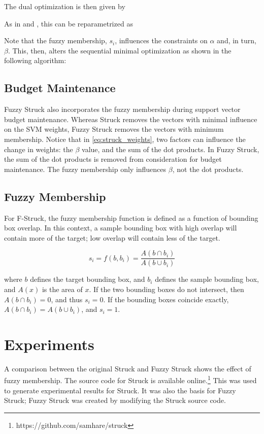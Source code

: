 \documentclass{IEEEtran}
\begin{document}
The dual optimization is then given by
\fuzzyStruckDualAlpha

As in \cite{sequential-minimal-optimization-a-fast-algorithm-for-training-support-vector-machines}
and \cite{6126251}, this can be reparametrized as
\fuzzyStruckDualBeta

Note that the fuzzy membership, \(s_i\), influences the constraints on \(\alpha\) and, in turn,
\(\beta\). This, then, alters the sequential minimal optimization as shown in the following
algorithm:

\fuzzyStruckSmo

\subsection{Budget Maintenance} %
Fuzzy Struck also incorporates the fuzzy membership during support vector budget maintenance.
Whereas Struck removes the vectors with minimal influence on the SVM weights, Fuzzy Struck removes
the vectors with minimum membership. Notice that in \eqref{eq:struck_weights}, two factors can
influence the change in weights: the \(\beta\) value, and the sum of the dot products. In Fuzzy
Struck, the sum of the dot products is removed from consideration for budget maintenance. The fuzzy
membership only influences \(\beta\), not the dot products.

\subsection{Fuzzy Membership} %
For F-Struck, the fuzzy membership function is defined as a function of bounding box overlap. In
this context, a sample bounding box with high overlap will contain more of the target; low overlap
will contain less of the target.

\begin{displaymath}
    s_i = f\left(b, b_i\right) = \frac{A(b \cap b_i)}{A(b \cup b_i)}
\end{displaymath}

where \(b\) defines the target bounding box, and \(b_i\) defines the sample bounding box, and
\(A(x)\) is the area of \(x\). If the two bounding boxes do not intersect, then \(A\left(b \cap
b_i\right) = 0\), and thus \(s_i = 0\). If the bounding boxes coincide exactly,
\(A\left(b \cap b_i\right) = A\left(b \cup b_i\right)\), and \(s_i = 1\).

\section{Experiments} %
A comparison between the original Struck and Fuzzy Struck shows the effect of fuzzy
membership. The source code for Struck is available online.\footnote{https://github.com/samhare/struck}
This was used to generate experimental results for Struck. It was also the basis for Fuzzy Struck;
Fuzzy Struck was created by modifying the Struck source code.
\end{document}
